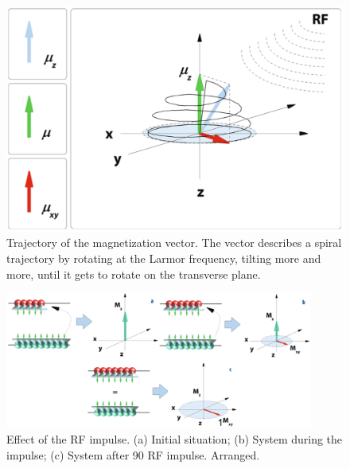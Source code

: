  \begin{figure}[h]
   \centering
   \begin{minipage}[c]{0.5\textwidth}
      \includegraphics[width=\textwidth]{images/trajectory_magnetization.png}
   \end{minipage}\hfill
   \begin{minipage}[b]{0.45\textwidth}
      \caption{Trajectory of the magnetization vector. The vector describes a spiral trajectory by rotating at the Larmor frequency, tilting more and more, until it gets to rotate on the transverse plane. \cite{elementiRisonanza}}
      \label{fig:trajectory_magnetization}
   \end{minipage} 
 \end{figure}

 \begin{figure}[h]
    \centering
    \includegraphics[width=0.9\textwidth]{images/energy_gaining.png}
    \caption{Effect of the RF impulse. (a) Initial situation; (b) System during the impulse; (c) System after 90 RF impulse. \cite{elementiRisonanza} Arranged.}
    \label{fig:energy_gaining}
 \end{figure}

